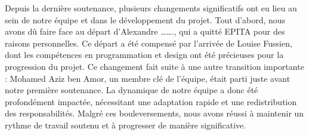 Depuis la dernière soutenance, plusieurs changements significatifs ont eu lieu au sein de notre équipe et dans le développement du projet. Tout d'abord, nous avons dû faire face au départ d'Alexandre ……., qui a quitté EPITA  pour des raisons personnelles. Ce départ a été compensé par l'arrivée de Louise Fussien, dont les compétences en programmation et design ont été précieuses pour la progression du projet.
Ce changement fait suite à une autre transition importante : Mohamed Aziz ben Amor, un membre clé de l'équipe, était parti juste avant notre première soutenance. La dynamique de notre équipe a donc été profondément impactée, nécessitant une adaptation rapide et une redistribution des responsabilités.
Malgré ces bouleversements, nous avons réussi à maintenir un rythme de travail soutenu et à progresser de manière significative. 
